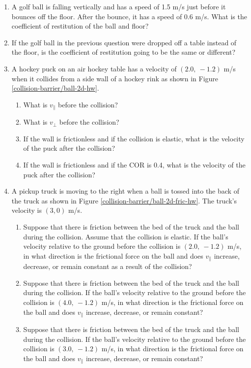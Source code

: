 \begin{enumerate}
	\item	A golf ball is falling vertically and has a speed of 1.5 m/s just before it bounces off the floor. After the bounce, it has a speed of 0.6 m/s. What is the coefficient of restitution of the ball and floor?
	\item If the golf ball in the previous question were dropped off a table instead of the floor, is the coefficient of restitution going to be the same or different?
	\item A hockey puck on an air hockey table has a velocity of $(2.0,\ -1.2)$ m/s when it collides from a side wall of a hockey rink as shown in Figure \ref{collision-barrier/ball-2d-hw}. 
	

	\begin{enumerate}
		\item What is $v_{\parallel}$ before the collision?
		\item What is $v_{\perp}$ before the collision?
		\item If the wall is frictionless and if the collision is elastic, what is the velocity of the puck after the collision?
		\item If the wall is frictionless and if the COR is 0.4, what is the velocity of the puck after the collision?
	\end{enumerate}
	
	\item A pickup truck is moving to the right when a ball is tossed into the back of the truck as shown in Figure \ref{collision-barrier/ball-2d-fric-hw}. The truck's velocity is $(3,0)$ m/s.
	
	\begin{enumerate}
		\item Suppose that there is friction between the bed of the truck and the ball during the collision. Assume that the collision is elastic. If the ball's velocity relative to the ground before the collision is $(2.0,\ -1.2)$ m/s, in what direction is the frictional force on the ball and does $v_{\parallel}$ increase, decrease, or remain constant as a result of the collision?
		\item Suppose that there is friction between the bed of the truck and the ball during the collision. If the ball's velocity relative to the ground before the collision is $(4.0,\ -1.2)$ m/s, in what direction is the frictional force on the ball and does $v_{\parallel}$ increase, decrease, or remain constant?
		\item Suppose that there is friction between the bed of the truck and the ball during the collision. If the ball's velocity relative to the ground before the collision is $(3.0,\ -1.2)$ m/s, in what direction is the frictional force on the ball and does $v_{\parallel}$ increase, decrease, or remain constant?
	\end{enumerate}


	
\end{enumerate}
